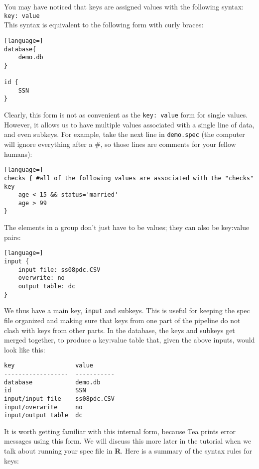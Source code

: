 \documentclass{article}
\begin{document}
You may have noticed that keys are assigned values with the following syntax:\\

{\tt key: value}\\

This syntax is equivalent to the following form with curly braces:
\begin{lstlisting}[language=]
database{
	demo.db
}

id {
	SSN
}
\end{lstlisting}

Clearly, this form is not as convenient as the {\tt key: value} form for single values. However, it allows 
us to have multiple values associated with a single line of data, and even subkeys. For example, take  
the next line in {\tt demo.spec} (the computer will 
ignore everything after a \#, so those lines are comments for your fellow humans):

\begin{lstlisting}[language=]
checks { #all of the following values are associated with the "checks" key
	age < 15 && status='married'
	age > 99
}
\end{lstlisting}

The elements in a group don't just have to be values; they can also be key:value pairs:

\begin{lstlisting}[language=]
input { 
    input file: ss08pdc.CSV
    overwrite: no
    output table: dc
}
\end{lstlisting}


We thus have a main key, {\tt input} and subkeys.  This is useful for keeping the spec
file organized and making sure that keys from one part of the pipeline do not clash with
keys from other parts.  In the database, the keys and subkeys get merged together,
to produce a key:value table that, given the above inputs, would look like this:

\begin{verbatim}
key                 value
------------------  -----------
database            demo.db
id                  SSN
input/input file    ss08pdc.CSV
input/overwrite     no
input/output table  dc
\end{verbatim}

It is worth getting familiar with this internal form, because Tea prints error messages
using this form.  We will discuss this more later in the tutorial when we talk about
running your spec file in \textbf{R}.  Here is a summary of the syntax
rules for keys:
\end{document}
